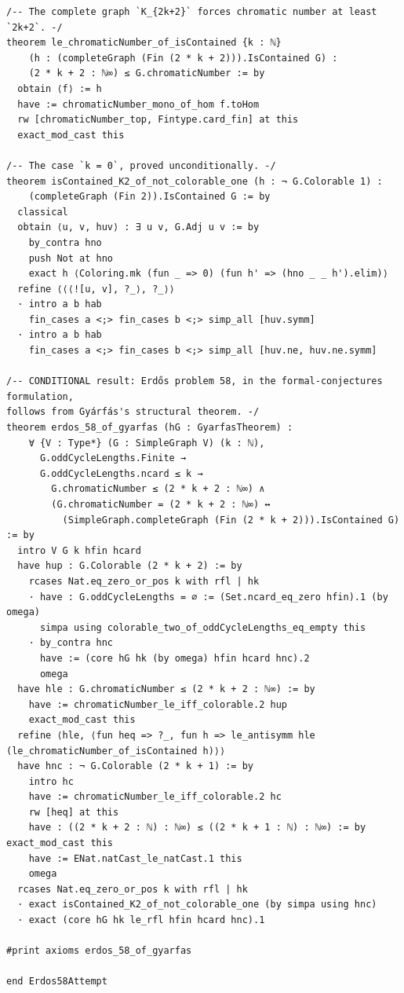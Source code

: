 \begin{verbatim}
/-- The complete graph `K_{2k+2}` forces chromatic number at least `2k+2`. -/
theorem le_chromaticNumber_of_isContained {k : ℕ}
    (h : (completeGraph (Fin (2 * k + 2))).IsContained G) :
    (2 * k + 2 : ℕ∞) ≤ G.chromaticNumber := by
  obtain ⟨f⟩ := h
  have := chromaticNumber_mono_of_hom f.toHom
  rw [chromaticNumber_top, Fintype.card_fin] at this
  exact_mod_cast this

/-- The case `k = 0`, proved unconditionally. -/
theorem isContained_K2_of_not_colorable_one (h : ¬ G.Colorable 1) :
    (completeGraph (Fin 2)).IsContained G := by
  classical
  obtain ⟨u, v, huv⟩ : ∃ u v, G.Adj u v := by
    by_contra hno
    push Not at hno
    exact h ⟨Coloring.mk (fun _ => 0) (fun h' => (hno _ _ h').elim)⟩
  refine ⟨⟨⟨![u, v], ?_⟩, ?_⟩⟩
  · intro a b hab
    fin_cases a <;> fin_cases b <;> simp_all [huv.symm]
  · intro a b hab
    fin_cases a <;> fin_cases b <;> simp_all [huv.ne, huv.ne.symm]

/-- CONDITIONAL result: Erdős problem 58, in the formal-conjectures formulation,
follows from Gyárfás's structural theorem. -/
theorem erdos_58_of_gyarfas (hG : GyarfasTheorem) :
    ∀ {V : Type*} (G : SimpleGraph V) (k : ℕ),
      G.oddCycleLengths.Finite →
      G.oddCycleLengths.ncard ≤ k →
        G.chromaticNumber ≤ (2 * k + 2 : ℕ∞) ∧
        (G.chromaticNumber = (2 * k + 2 : ℕ∞) ↔
          (SimpleGraph.completeGraph (Fin (2 * k + 2))).IsContained G) := by
  intro V G k hfin hcard
  have hup : G.Colorable (2 * k + 2) := by
    rcases Nat.eq_zero_or_pos k with rfl | hk
    · have : G.oddCycleLengths = ∅ := (Set.ncard_eq_zero hfin).1 (by omega)
      simpa using colorable_two_of_oddCycleLengths_eq_empty this
    · by_contra hnc
      have := (core hG hk (by omega) hfin hcard hnc).2
      omega
  have hle : G.chromaticNumber ≤ (2 * k + 2 : ℕ∞) := by
    have := chromaticNumber_le_iff_colorable.2 hup
    exact_mod_cast this
  refine ⟨hle, ⟨fun heq => ?_, fun h => le_antisymm hle (le_chromaticNumber_of_isContained h)⟩⟩
  have hnc : ¬ G.Colorable (2 * k + 1) := by
    intro hc
    have := chromaticNumber_le_iff_colorable.2 hc
    rw [heq] at this
    have : ((2 * k + 2 : ℕ) : ℕ∞) ≤ ((2 * k + 1 : ℕ) : ℕ∞) := by exact_mod_cast this
    have := ENat.natCast_le_natCast.1 this
    omega
  rcases Nat.eq_zero_or_pos k with rfl | hk
  · exact isContained_K2_of_not_colorable_one (by simpa using hnc)
  · exact (core hG hk le_rfl hfin hcard hnc).1

#print axioms erdos_58_of_gyarfas

end Erdos58Attempt
\end{verbatim}

